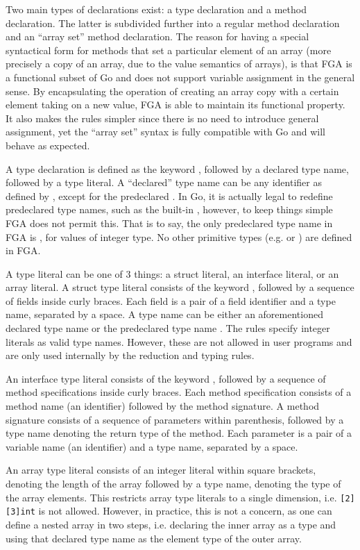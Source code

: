 Two main types of declarations exist: a type declaration and a method
declaration. The latter is subdivided further into a regular method declaration
and an ``array set'' method declaration. The reason for having a special
syntactical form for methods that set a particular element of an array (more
precisely a copy of an array, due to the value semantics of arrays), is that
FGA is a functional subset of Go and does not support variable assignment in
the general sense. By encapsulating the operation of creating an array copy with
a certain element taking on a new value, FGA is able to maintain its functional
property. It also makes the rules simpler since there is no need to introduce
general assignment, yet the ``array set'' syntax is fully compatible with Go and
will behave as expected.

A type declaration is defined as the keyword \type, followed by a declared type
name, followed by a type literal. A ``declared'' type name can be any identifier
as defined by \textcite{spec}, except for the predeclared . In Go, it is
actually legal to redefine predeclared type names, such as the built-in
, however, to keep things simple FGA does not permit this. That is to
say, the only predeclared type name in FGA is , for values of integer
type. No other primitive types (e.g.  or ) are defined in
FGA.

A type literal can be one of 3 things: a struct literal, an interface literal,
or an array literal. A struct type literal consists of the keyword \struct,
followed by a sequence of fields inside curly braces. Each field is a pair of a
field identifier and a type name, separated by a space. A type name can be
either an aforementioned declared type name or the predeclared type name
. The rules specify integer literals as valid type names. However, these
are not allowed in user programs and are only used internally by the reduction
and typing rules.

An interface type literal consists of the keyword \interface, followed by a
sequence of method specifications inside curly braces. Each method specification
consists of a method name (an identifier) followed by the method signature. A
method signature consists of a sequence of parameters within parenthesis,
followed by a type name denoting the return type of the method. Each parameter
is a pair of a variable name (an identifier) and a type name, separated by a
space.

An array type literal consists of an integer literal within square brackets,
denoting the length of the array followed by a type name, denoting the type of
the array elements. This restricts array type literals to a single dimension,
i.e. \texttt{[2][3]int} is not allowed. However, in practice, this is not a
concern, as one can define a nested array in two steps, i.e. declaring the inner
array as a type and using that declared type name as the element type of the
outer array.

